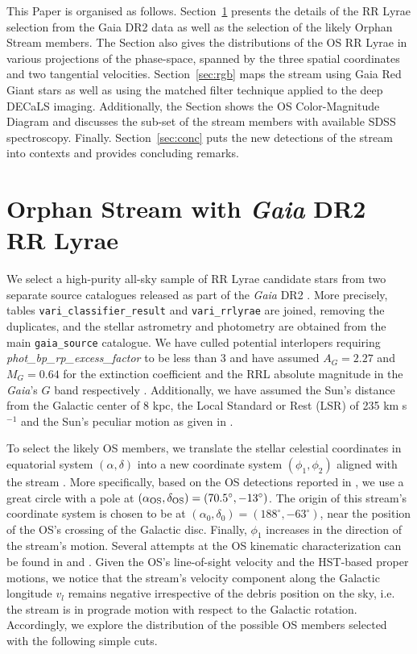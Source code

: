 \documentclass[a4paper,useAMS,usenatbib]{mnras}
\newcommand{\Gaia}{{\it Gaia}}
\newcommand{\gaia}{\textit{Gaia} }
\begin{document}
This Paper is organised as follows. Section~\ref{sec:rrl} presents the
details of the RR Lyrae selection from the Gaia DR2 data as well as
the selection of the likely Orphan Stream members. The Section also
gives the distributions of the OS RR Lyrae in various projections of
the phase-space, spanned by the three spatial coordinates and two
tangential velocities. Section~\ref{sec:rgb} maps the stream using
Gaia Red Giant stars as well as using the matched filter technique
applied to the deep DECaLS imaging. Additionally, the Section shows
the OS Color-Magnitude Diagram and discusses the sub-set of the stream
members with available SDSS
spectroscopy. Finally. Section~\ref{sec:conc} puts the new detections
of the stream into contexts and provides concluding remarks.

\section{Orphan Stream with \gaia DR2 RR Lyrae}
\label{sec:rrl}

We select a high-purity all-sky sample of RR Lyrae candidate stars
from two separate source catalogues released as part of the \gaia DR2
\citep[][]{Prusti2016, Brown2018}. More precisely, tables
\texttt{vari\_classifier\_result} and \texttt{vari\_rrlyrae}
\citep[see][]{Clementini2018,Holl2018} are joined, removing the
duplicates, and the stellar astrometry and photometry are obtained
from the main \texttt{gaia\_source} catalogue. We have culled
potential interlopers requiring \textit{phot\_bp\_rp\_excess\_factor}
to be less than 3 and have assumed $A_G=2.27$ and $M_G=0.64$ for the
extinction coefficient and the RRL absolute magnitude in the \Gaia's
$G$ band respectively \citep[see][for further
  details]{Iorio2018}. Additionally, we have assumed the Sun's
distance from the Galactic center of 8 kpc, the Local Standard or Rest
(LSR) of 235 km s$^{-1}$ and the Sun's peculiar motion as given in
\citet{LSR}.

To select the likely OS members, we translate the stellar celestial
coordinates in equatorial system $(\alpha, \delta)$ into a new
coordinate system $(\phi_1, \phi_2)$ aligned with the stream
\citep[see e.g.][]{Koposov2010}. More specifically, based on the OS
detections reported in \citet{OS_V, OS_C, Newberg2010}, we use a great
circle with a pole at $(\alpha_{\rm OS}, \delta_{\rm
  OS})=(70.5^{\circ}, -13^{\circ})$. The origin of this stream's
coordinate system is chosen to be at $(\alpha_0,
\delta_0)=(188^{\circ}, -63^{\circ})$, near the position of the OS's
crossing of the Galactic disc. Finally, $\phi_1$ increases in the
direction of the stream's motion. Several attempts at the OS kinematic
characterization can be found in \citet{Newberg2010} and
\citet{Sohn2016}. Given the OS's line-of-sight velocity and the
HST-based proper motions, we notice that the stream's velocity
component along the Galactic longitude $v_l$ remains negative
irrespective of the debris position on the sky, i.e. the stream is in
prograde motion with respect to the Galactic rotation. Accordingly, we
explore the distribution of the possible OS members selected with the
following simple cuts.
\end{document}
